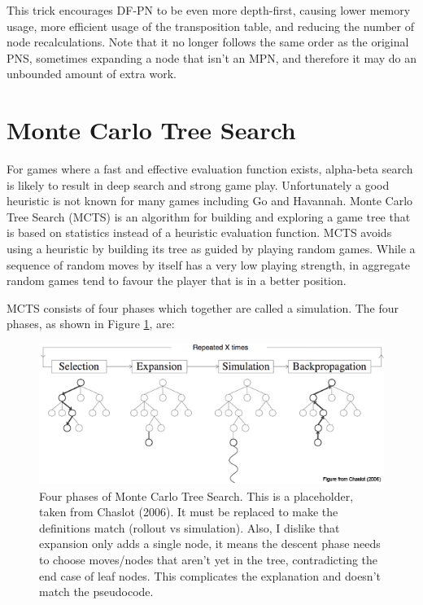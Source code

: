 This trick encourages DF-PN to be even more depth-first, causing lower memory usage, more efficient usage of the transposition table, and reducing the number of node recalculations. Note that it no longer follows the same order as the original PNS, sometimes expanding a node that isn't an MPN, and therefore it may do an unbounded amount of extra work.






\section{Monte Carlo Tree Search}

For games where a fast and effective evaluation function exists, alpha-beta search is likely to result in deep search and strong game play. Unfortunately  a good heuristic is not known for many games including Go and Havannah. Monte Carlo Tree Search (MCTS) is an algorithm for building and exploring a game tree that is based on statistics instead of a heuristic evaluation function. MCTS avoids using a heuristic by building its tree as guided by playing random games. While a sequence of random moves by itself has a very low playing strength, in aggregate random games tend to favour the player that is in a better position.

MCTS consists of four phases which together are called a simulation. The four phases, as shown in Figure \ref{fig:mcts}, are:

\begin{figure}

\includegraphics[width=\linewidth]{mcts-chaslot.png}

\caption{Four phases of Monte Carlo Tree Search. This is a placeholder, taken from Chaslot (2006). It must be replaced to make the definitions match (rollout vs simulation). Also, I dislike that expansion only adds a single node, it means the descent phase needs to choose moves/nodes that aren't yet in the tree, contradicting the end case of leaf nodes. This complicates the explanation and doesn't match the pseudocode.}
\label{fig:mcts}
\end{figure}

